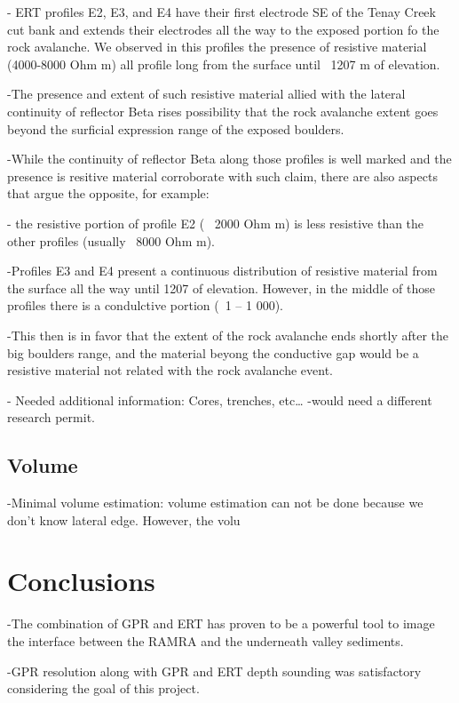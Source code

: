 \documentclass[5p]{elsarticle}
\begin{document}
- ERT profiles E2, E3, and E4 have their first electrode SE of the Tenay Creek cut bank and extends their electrodes all the way to the exposed portion fo the rock avalanche. We observed in this profiles the presence of resistive material (4000-8000 Ohm m) all profile long from the surface until ~1207 m of elevation.

-The presence and extent of such resistive material allied with the lateral continuity of reflector Beta rises possibility that the rock avalanche extent goes beyond the surficial expression range of the exposed boulders. 

-While the continuity of reflector Beta along those profiles is well marked and the presence is resitive material corroborate with such claim, there are also aspects that argue the opposite, for example:


- the resistive portion of profile E2 (~ 2000 Ohm m) is less resistive than the other profiles (usually ~8000 Ohm m). 


-Profiles E3 and E4 present a continuous distribution of resistive material from the surface all the way until 1207 of elevation. However, in the middle of those profiles there is a condulctive portion (~1 – 1 000). 

-This then is in favor that the extent of the rock avalanche ends shortly after the big boulders range, and the material beyong the conductive gap would be a resistive material not related with the rock avalanche event. 

- Needed additional information: Cores, trenches, etc…
	-would need a different research permit.


\subsection{Volume}

-Minimal volume estimation:    volume estimation can not be done because we don’t know lateral edge. However, the volu  




\section{Conclusions}

-The combination of GPR and ERT has proven to be a powerful tool to image the interface between the RAMRA and the underneath valley sediments. 


-GPR resolution along with GPR and ERT depth sounding was satisfactory considering the goal of this project. 
\end{document}
